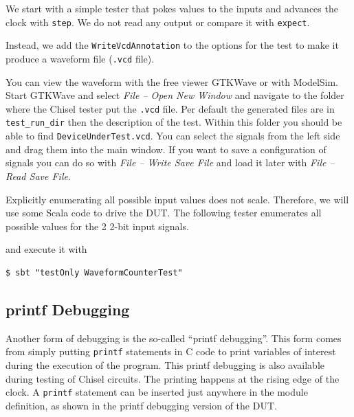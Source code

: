 \documentclass[%
    10pt,
    headinclude, footexclude,
    openright, %
    notitlepage,
    cleardoubleempty,
    headsepline,
    pointlessnumbers,
    bibtotoc, idxtotoc,
    ]{scrbook}
\newcommand{\code}[1]{{\small{\texttt{#1}}}}
\begin{document}

\noindent We start with a simple tester that pokes values to the inputs and advances
the clock with \code{step}. We do not read any output or compare it with \code{expect}.


\noindent Instead, we add the \code{WriteVcdAnnotation} to the options for the 
test to make it produce a waveform file (\code{.vcd} file).

You can view the waveform with the free viewer GTKWave or with ModelSim.
Start GTKWave and select \emph{File -- Open New Window} and navigate to the
folder where the Chisel tester put the \code{.vcd} file. Per default the generated files
are in \code{test\_run\_dir} then the description of the test.
Within this folder you should be able to find \code{DeviceUnderTest.vcd}.
You can select the signals from the left side and drag them into the main window.
If you want to save a configuration of signals you can do so with \emph{File -- Write Save File}
and load it later with \emph{File -- Read Save File}.

Explicitly enumerating all possible input values does not scale. Therefore, we will use
some Scala code to drive the DUT. The following tester enumerates all possible values for
the 2 2-bit input signals.


\noindent and execute it with

\begin{verbatim}
$ sbt "testOnly WaveformCounterTest"
\end{verbatim}

\subsection{printf Debugging}

Another form of debugging is the so-called ``printf debugging''. This form comes from
simply putting \code{printf} statements in C code to print variables of interest during
the execution of the program. This printf debugging is also available during testing
of Chisel circuits. The printing happens at the rising edge of the clock.
A \code{printf} statement can be inserted just anywhere in the module definition,
as shown in the printf debugging version of the DUT.

\end{document}
